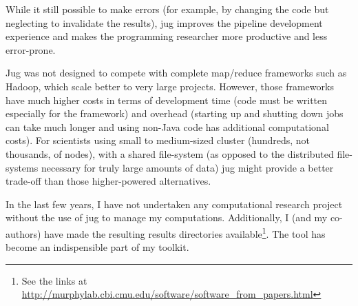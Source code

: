 \documentclass{article}
\begin{document}
While it still possible to make errors (for example, by changing the code but
neglecting to invalidate the results), jug improves the pipeline development
experience and makes the programming researcher more productive and less
error-prone.

Jug was not designed to compete with complete map/reduce frameworks such as
Hadoop, which scale better to very large projects. However, those frameworks
have much higher costs in terms of development time (code must be written
especially for the framework) and overhead (starting up and shutting down jobs
can take much longer and using non-Java code has additional computational
costs). For scientists using small to medium-sized cluster (hundreds, not
thousands, of nodes), with a shared file-system (as opposed to the distributed
file-systems necessary for truly large amounts of data) jug might provide a
better trade-off than those higher-powered alternatives.

In the last few years, I have not undertaken any computational research project
without the use of jug to manage my computations. Additionally, I (and my
co-authors) have made the resulting results directories available\footnote{See
the links at
\url{http://murphylab.cbi.cmu.edu/software/software_from_papers.html}}. The
tool has become an indispensible part of my toolkit.

\printbibliography
\end{document}
